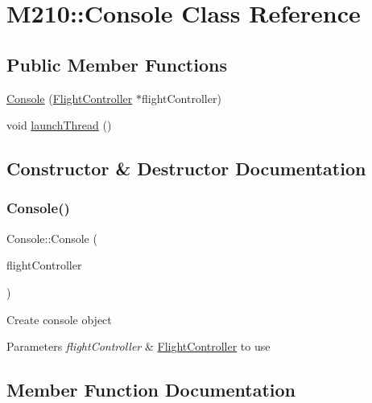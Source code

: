 \hypertarget{class_m210_1_1_console}{}\section{M210\+:\+:Console Class Reference}
\label{class_m210_1_1_console}
\subsection*{Public Member Functions}
\begin{DoxyCompactItemize}
\item 
\mbox{\hyperlink{class_m210_1_1_console_a144a023dffce3c666a3c7b160c6396e2}{Console}} (\mbox{\hyperlink{class_m210_1_1_flight_controller}{Flight\+Controller}} $\ast$flight\+Controller)
\item 
void \mbox{\hyperlink{class_m210_1_1_console_a46110349066e1bfb0ba274976da10a39}{launch\+Thread}} ()
\end{DoxyCompactItemize}


\subsection{Constructor \& Destructor Documentation}
\mbox{\label{class_m210_1_1_console_a144a023dffce3c666a3c7b160c6396e2}} 
\subsubsection{\texorpdfstring{Console()}{Console()}}
{\footnotesize\ttfamily Console\+::\+Console (\begin{DoxyParamCaption}\item[{\mbox{\hyperlink{class_m210_1_1_flight_controller}{Flight\+Controller}} $\ast$}]{flight\+Controller }\end{DoxyParamCaption})\hspace{0.3cm}{\ttfamily [explicit]}}

Create console object 
\begin{DoxyParams}{Parameters}
{\em flight\+Controller} & \mbox{\hyperlink{class_m210_1_1_flight_controller}{Flight\+Controller}} to use \\
\hline
\end{DoxyParams}


\subsection{Member Function Documentation}
\mbox{\label{class_m210_1_1_console_a46110349066e1bfb0ba274976da10a39}} 

